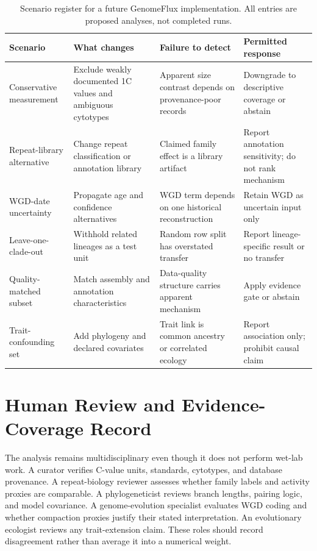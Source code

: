 \documentclass[conference]{IEEEtran}
\begin{document}
\begin{table}[t]
\caption{Scenario register for a future GenomeFlux implementation. All entries are proposed analyses, not completed runs.}
\label{tab:scenarios}
\centering
\footnotesize
\renewcommand{\arraystretch}{1.14}
\begin{tabular}{|p{}|p{}|p{}|p{}|}
\hline
\textbf{Scenario} & \textbf{What changes} & \textbf{Failure to detect} & \textbf{Permitted response} \\
\hline
Conservative measurement & Exclude weakly documented 1C values and ambiguous cytotypes & Apparent size contrast depends on provenance-poor records & Downgrade to descriptive coverage or abstain \\
\hline
Repeat-library alternative & Change repeat classification or annotation library & Claimed family effect is a library artifact & Report annotation sensitivity; do not rank mechanism \\
\hline
WGD-date uncertainty & Propagate age and confidence alternatives & WGD term depends on one historical reconstruction & Retain WGD as uncertain input only \\
\hline
Leave-one-clade-out & Withhold related lineages as a test unit & Random row split has overstated transfer & Report lineage-specific result or no transfer \\
\hline
Quality-matched subset & Match assembly and annotation characteristics & Data-quality structure carries apparent mechanism & Apply evidence gate or abstain \\
\hline
Trait-confounding set & Add phylogeny and declared covariates & Trait link is common ancestry or correlated ecology & Report association only; prohibit causal claim \\
\hline
\end{tabular}
\end{table}

\section{Human Review and Evidence-Coverage Record}

The analysis remains multidisciplinary even though it does not perform wet-lab work. A curator verifies C-value units, standards, cytotypes, and database provenance. A repeat-biology reviewer assesses whether family labels and activity proxies are comparable. A phylogeneticist reviews branch lengths, pairing logic, and model covariance. A genome-evolution specialist evaluates WGD coding and whether compaction proxies justify their stated interpretation. An evolutionary ecologist reviews any trait-extension claim. These roles should record disagreement rather than average it into a numerical weight.
\end{document}
